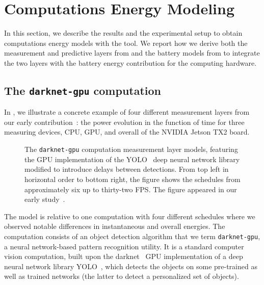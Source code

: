 \section{Computations Energy Modeling}
\label{sec:res-ene-comps}

In this section, we describe the results and the experimental setup to obtain computations energy models with the \powprof{} tool. We report how we derive both the measurement and predictive layers from  and the battery models from  to integrate the two layers with the battery energy contribution for the computing hardware.

\subsection{The {\tt darknet-gpu} computation}
\label{sec:res-darknet-gpu}

In , we illustrate a concrete example of four different measurement layers from our early contribution~\citep{seewald2019coarse}: the power evolution in the function of time for three measuring devices, CPU, GPU, and overall of the NVIDIA Jetson TX2 board. 
\begin{figure}[h!]
  \begin{minipage}{.93\textwidth}
  \centering
  \selectfont
  \hspace*{20ex}
  
  \end{minipage}
  \caption[The {\tt darknet-gpu} computation measurement layer models]{The {\tt darknet-gpu} computation measurement layer models, featuring the GPU implementation of the YOLO~\citep{redmon2016you} deep neural network library modified to introduce delays between detections. From top left in horizontal order to bottom right, the figure shows the schedules from approximately six up to thirty-two FPS. The figure appeared in our early study~\citep{seewald2019coarse}.}
  \label{fig:darknet-layer1}
\end{figure}
The model is relative to one computation with four different schedules where we observed notable differences in instantaneous and overall energies. The computation consists of an object detection algorithm that we term {\small\tt darknet-gpu}, a neural network-based pattern recognition utility. It is a standard computer vision computation, built upon the darknet~\citep{redmond2017yolo,redomnd2013darknet} GPU implementation of a deep neural network library YOLO~\citep{redmon2016you}, which detects the objects on some pre-trained as well as trained networks (the latter to detect a personalized set of objects).

